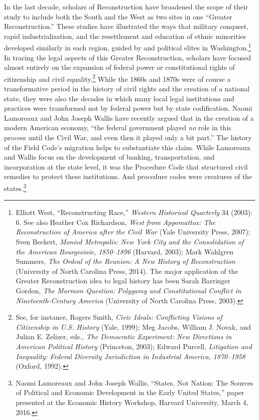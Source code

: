 \documentclass[12pt,]{article}
\let\rmarkdownfootnote\footnote%
\def\footnote{\protect\rmarkdownfootnote}
\begin{document}
In the last decade, scholars of Reconstruction have broadened the scope
of their study to include both the South and the West as two sites in
one ``Greater Reconstruction.'' These studies have illustrated the ways
that military conquest, rapid industrialization, and the resettlement
and education of ethnic minorities developed similarly in each region,
guided by and political elites in Washington.\footnote{Elliott West,
  ``Reconstructing Race,'' \emph{Western Historical Quarterly} 34
  (2003): 6. See also Heather Cox Richardson, \emph{West from
  Appomattox: The Reconstruction of America after the Civil War} (Yale
  University Press, 2007); Sven Beckert, \emph{Monied Metropolis: New
  York City and the Consolidation of the American Bourgeoisie,
  1850--1896} (Harvard, 2003); Mark Wahlgren Summers, \emph{The Ordeal
  of the Reunion: A New History of Reconstruction} (University of North
  Carolina Press, 2014). The major application of the Greater
  Reconstruction idea to legal history has been Sarah Barringer Gordon,
  \emph{The Mormon Question: Polygamy and Constitutional Conflict in
  Nineteenth-Century America} (University of North Carolina Press,
  2003).} In tracing the legal aspects of this Greater Reconstruction,
scholars have focused almost entirely on the expansion of federal power
or constitutional rights of citizenship and civil equality.\footnote{See,
  for instance, Rogers Smith, \emph{Civic Ideals: Conflicting Visions of
  Citizenship in U.S. History} (Yale, 1999); Meg Jacobs, William J.
  Novak, and Julian E. Zelizer, eds., \emph{The Democratic Experiment:
  New Directions in American Political History} (Princeton, 2003);
  Edward Purcell, \emph{Litigation and Inequality: Federal Diversity
  Jurisdiction in Industrial America, 1870--1958} (Oxford, 1992).} While
the 1860s and 1870s were of course a transformative period in the
history of civil rights and the creation of a national state, they were
also the decades in which many local legal institutions and practices
were transformed not by federal power but by state codification. Naomi
Lamoreaux and John Joseph Wallis have recently argued that in the
creation of a modern American economy, ``the federal government played
\emph{no} role in this process until the Civil War, and even then it
played only a bit part.'' The history of the Field Code's migration
helps to substantiate this claim. While Lamoreaux and Wallis focus on
the development of banking, transportation, and incorporation at the
state level, it was the Procedure Code that structured civil remedies to
protect these institutions. And procedure codes were creatures of the
states.\footnote{Naomi Lamoreaux and John Joseph Wallis, ``States, Not
  Nation: The Sources of Political and Economic Development in the Early
  United States,'' paper presented at the Economic History Workshop,
  Harvard University, March 4, 2016.}
\end{document}
